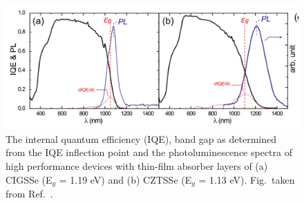 \documentclass[11pt, twoside]{report}
\begin{document}
\begin{figure}[h!]
  \centering
    \includegraphics[width=1.0\textwidth]{figures/CZTS+CIGS_PL.png}
    \caption[The internal quantum efficiency (IQE), band gap as determined from the IQE inflection point and the photoluminescence spectra of high performance devices with thin-film absorber layers of (a) CIGSSe (E$_g$ = 1.19 eV) and (b) CZTSSe (E$_g$ = 1.13 eV).]{The internal quantum efficiency (IQE), band gap as determined from the IQE inflection point and the photoluminescence spectra of high performance devices with thin-film absorber layers of (a) CIGSSe (E$_g$ = 1.19 eV) and (b) CZTSSe (E$_g$ = 1.13 eV). Fig.~taken from Ref.~.}
  \label{CZTS+CIGS_PL}
\end{figure}
\end{document}
